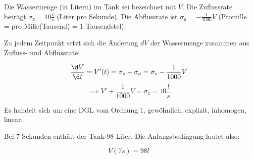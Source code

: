 \item

Die Wassermenge (in Litern) im Tank sei bezeichnet mit $V$. Die Zuflussrate beträgt $\sigma_z = 10 \frac{l}{s}$ (Liter pro Sekunde). Die Abflussrate ist $\sigma_a = -\frac{1}{1000} V$ (Promille = pro Mille(Tausend) = 1 Tausendstel).

Zu jedem Zeitpunkt setzt sich die Änderung $dV$ der Wassermenge zusammen aus Zufluss- und Abflussrate:

$$\frac{\d V}{\d t} = V'(t) = \sigma_z + \sigma_a = \sigma_z - \frac{1}{1000}V$$
$$\implies V' + \frac{1}{1000} V = \sigma_z = 10 \frac{l}{s}$$

Es handelt sich um eine DGL vom Ordnung 1, gewöhnlich, explizit, inhomogen, linear.

Bei 7 Sekunden enthält der Tank 98 Liter. Die Anfangsbedingung lautet also:

$$V(7s) = 98l$$


